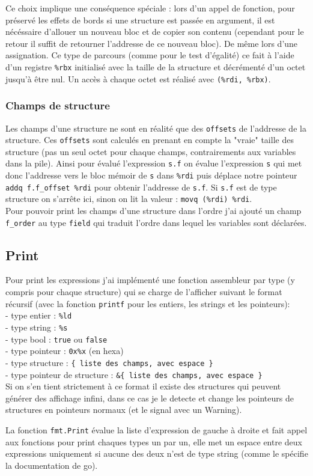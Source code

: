 \documentclass[9pt,a4paper]{article}
\begin{document}
Ce choix implique une conséquence spéciale : lors d'un appel de fonction, pour préservé les effets de bords si une structure est passée en argument, il est nécéssaire d'allouer un nouveau bloc et de copier son contenu (cependant pour le retour il suffit de retourner l'addresse de ce nouveau bloc). De même lors d'une assignation. Ce type de parcours (comme pour le test d'égalité) ce fait à l'aide d'un registre \verb|%rbx| initialisé avec la taille de la structure et décrémenté d'un octet jusqu'à être nul. Un accès à chaque octet est réalisé avec \verb|(%rdi, %rbx)|.

\subsubsection*{Champs de structure}

Les champs d'une structure ne sont en réalité que des \verb|offsets| de l'addresse de la structure. Ces \verb|offsets| sont calculés en prenant en compte la "vraie" taille des structure (pas un seul octet pour chaque champs, contrairements aux variables dans la pile). Ainsi pour évalué l'expression \verb|s.f| on évalue l'expression \verb|s| qui met donc l'addresse vers le bloc mémoir de \verb|s| dans \verb|%rdi| puis déplace notre pointeur \verb|addq f.f_offset %rdi| pour obtenir l'addresse de \verb|s.f|. Si \verb|s.f| est de type structure on s'arrête ici, sinon on lit la valeur : \verb|movq (%rdi) %rdi|.
\\

Pour pouvoir print les champs d'une structure dans l'ordre j'ai ajouté un champ \verb|f_order| au type \verb|field| qui traduit l'ordre dans lequel les variables sont déclarées.

\subsection{Print}

Pour print les expressions j'ai implémenté une fonction assembleur par type (y compris pour chaque structure) qui se charge de l'afficher suivant le format récursif (avec la fonction \verb|printf| pour les entiers, les strings et les pointeurs): \\
 - type entier : \verb|%ld| \\
 - type string : \verb|%s| \\
 - type bool : \verb|true| ou \verb|false| \\
 - type pointeur : \verb|0x%x| (en hexa) \\
 - type structure : \verb|{ liste des champs, avec espace }| \\
 - type pointeur de structure : \verb|&{ liste des champs, avec espace }| \\

Si on s'en tient strictement à ce format il existe des structures qui peuvent générer des affichage infini, dans ce cas je le detecte et change les pointeurs de structures en pointeurs normaux (et le signal avec un Warning).

La fonction \verb|fmt.Print| évalue la liste d'expression de gauche à droite et fait appel aux fonctions pour print chaques types un par un, elle met un espace entre deux expressions uniquement si aucune des deux n'est de type string (comme le spécifie la documentation de go).
\end{document}
